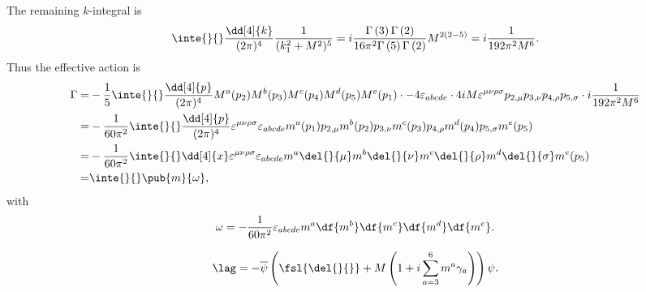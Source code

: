 The remaining $k$-integral is
\begin{align*}
	\inte{}{}\frac{\dd[4]{k}}{(2\pi)^{4}}\frac{1}{(k_{1}^{2} + M^{2})^{5}} = i\frac{\Gamma\left(3\right)\Gamma\left(2\right)}{16\pi^{2}\Gamma\left(5\right)\Gamma\left(2\right)}M^{2(2 - 5)} = i\frac{1}{192\pi^{2}M^{6}}.
\end{align*}
Thus the effective action is
\begin{align*}
	\Gamma =& -\frac{1}{5}\inte{}{}\frac{\dd[4]{p}}{(2\pi)^{4}}M^{a}(p_{2})M^{b}(p_{3})M^{c}(p_{4})M^{d}(p_{5})M^{e}(p_{1})\cdot -4\varepsilon_{abcde}\cdot 4iM\varepsilon^{\mu\nu\rho\sigma}p_{2, \mu}p_{3, \nu}p_{4, \rho}p_{5, \sigma}\cdot i\frac{1}{192\pi^{2}M^{6}} \\
	=& -\frac{1}{60\pi^{2}}\inte{}{}\frac{\dd[4]{p}}{(2\pi)^{4}}\varepsilon^{\mu\nu\rho\sigma}\varepsilon_{abcde}m^{a}(p_{1})p_{2, \mu}m^{b}(p_{2})p_{3, \nu}m^{c}(p_{3})p_{4, \rho}m^{d}(p_{4})p_{5, \sigma}m^{e}(p_{5}) \\
	=& -\frac{1}{60\pi^{2}}\inte{}{}\dd[4]{x}\varepsilon^{\mu\nu\rho\sigma}\varepsilon_{abcde}m^{a}\del{}{\mu}m^{b}\del{}{\nu}m^{c}\del{}{\rho}m^{d}\del{}{\sigma}m^{e}(p_{5}) \\
	=& \inte{}{}\pub{m}{\omega},
\end{align*}
with
\begin{align*}
	\omega = -\frac{1}{60\pi^{2}}\varepsilon_{abcde}m^{a}\df{m^{b}}\df{m^{c}}\df{m^{d}}\df{m^{e}}.
\end{align*}

\begin{align*}
	\lag = -\overline{\psi}\left(\fsl{\del{}{}} + M\left(1 + i\sum\limits_{a = 3}^{6}m^{a}\gamma_{a}\right)\right)\psi.
\end{align*}